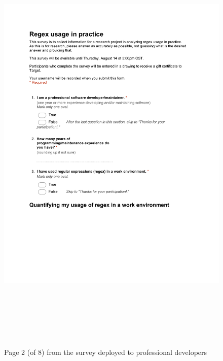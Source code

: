 \begin{figure}[!htbp]
   \centering
       \includegraphics[page=2, height=21cm,keepaspectratio]{nontex/appendix/regexUsageInPracticeSurvey}
 \caption{Page 2 (of 8) from the survey deployed to professional developers}
 \label{fig:surveyPDF2}
\end{figure}

